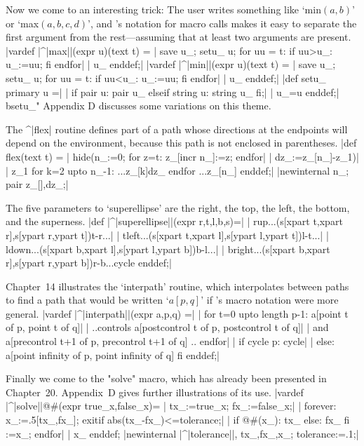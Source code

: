 Now we come to an interesting trick: The user writes something like
`min$(a,b)$' or `max$(a,b,c,d)$', and
\MF's notation for macro calls makes it easy to separate the first argument
from the rest---assuming that at least two arguments are present.
\beginlines
|vardef |^|max||(expr u)(text t) = %
| save u_; setu_ u; for uu = t: if uu>u_: u_:=uu; fi endfor|
| u_ enddef;|
\smallskip
|vardef |^|min||(expr u)(text t) = %
| save u_; setu_ u; for uu = t: if uu<u_: u_:=uu; fi endfor|
| u_ enddef;|
\smallskip
|def setu_ primary u =|
| if pair u: pair u_ elseif string u: string u_ fi;|
| u_=u enddef;|
\weakendlines
^^"setu\_" Appendix D discusses some variations on this theme.

The ^|flex| routine defines part of a path whose directions at the
endpoints will depend on the environment, because this path is not
enclosed in parentheses.
\beginlines
|def flex(text t) =           %
| hide(n_:=0; for z=t: z_[incr n_]:=z; endfor|
|  dz_:=z_[n_]-z_1)|
| z_1 for k=2 upto n_-1: ...z_[k]{dz_} endfor ...z_[n_] enddef;|
|newinternal n_; pair z_[],dz_;|
\endlines

The five parameters to `superellipse' are the right, the top, the left,
the bottom, and the superness.
\beginlines
|def |^|superellipse||(expr r,t,l,b,s)=|
| r{up}...(s[xpart t,xpart r],s[ypart r,ypart t]){t-r}...|
| t{left}...(s[xpart t,xpart l],s[ypart l,ypart t]){l-t}...|
| l{down}...(s[xpart b,xpart l],s[ypart l,ypart b]){b-l}...|
| b{right}...(s[xpart b,xpart r],s[ypart r,ypart b]){r-b}...cycle enddef;|
\endlines

Chapter~14 illustrates the `interpath' routine, which interpolates
between paths to find a path that would be written `$a[p,q]$' if
\MF's macro notation were more general.
\beginlines
|vardef |^|interpath||(expr a,p,q) =|
| for t=0 upto length p-1: a[point t of p, point t of q]|
|  ..controls a[postcontrol t of p, postcontrol t of q]|
|   and a[precontrol t+1 of p, precontrol t+1 of q] .. endfor|
| if cycle p: cycle|
| else: a[point infinity of p, point infinity of q] fi enddef;|
\endlines

Finally we come to the "solve" macro, which has already been presented
in Chapter~20. Appendix~D gives further illustrations of its use.
\beginlines
|vardef |^|solve||@#(expr true_x,false_x)= %
| tx_:=true_x; fx_:=false_x;|
| forever: x_:=.5[tx_,fx_]; exitif abs(tx_-fx_)<=tolerance;|
| if @#(x_): tx_ else: fx_ fi :=x_; endfor|
| x_ enddef; %
|newinternal |^|tolerance||, tx_,fx_,x_; tolerance:=.1;|
\finalendlines

